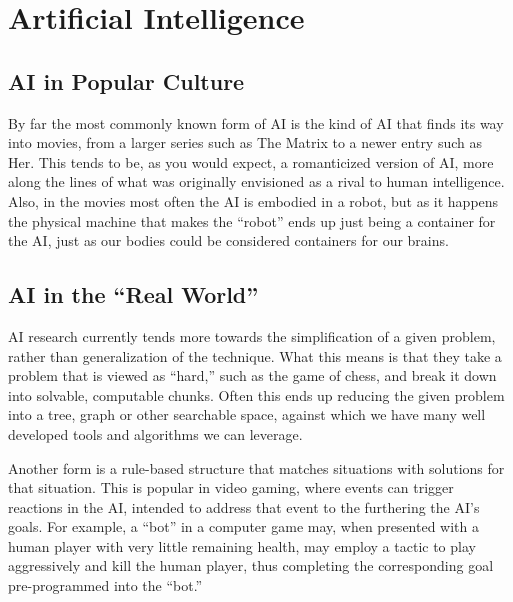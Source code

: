\documentclass[12pt]{article} %
\begin{document}

\section{Artificial Intelligence} %


\subsection{AI in Popular Culture}

By far the most commonly known form of AI is the kind of AI that finds its way into movies, from a larger series such as The Matrix to a newer entry such as Her. This tends to be, as you would expect, a romanticized version of AI, more along the lines of what was originally envisioned as a rival to human intelligence. Also, in the movies most often the AI is embodied in a robot, but as it happens the physical machine that makes the ``robot'' ends up just being a container for the AI, just as our bodies could be considered containers for our brains.


\subsection{AI in the ``Real World''}

AI research currently tends more towards the simplification of a given problem, rather than generalization of the technique. What this means is that they take a problem that is viewed as ``hard,'' such as the game of chess, and break it down into solvable, computable chunks. Often this ends up reducing the given problem into a tree, graph or other searchable space, against which we have many well developed tools and algorithms we can leverage.

Another form is a rule-based structure that matches situations with solutions for that situation. This is popular in video gaming, where events can trigger reactions in the AI, intended to address that event to the furthering the AI's goals. For example, a ``bot'' in a computer game may, when presented with a human player with very little remaining health, may employ a tactic to play aggressively and kill the human player, thus completing the corresponding goal pre-programmed into the ``bot.''
\end{document}
